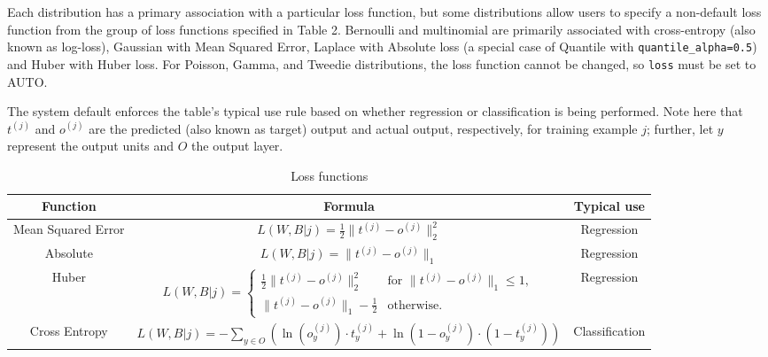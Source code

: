 Each distribution has a primary association with a particular loss function, but some distributions allow users to specify a non-default loss function from the group of loss functions specified in Table 2.  Bernoulli and multinomial are primarily associated with cross-entropy (also known as log-loss), Gaussian with Mean Squared Error, Laplace with Absolute loss (a special case of Quantile with \texttt{quantile\_alpha=0.5}) and Huber with Huber loss.  For Poisson, Gamma, and Tweedie distributions, the loss function cannot be changed, so \texttt{loss} must be set to AUTO.    


The system default enforces the table's typical use rule based on whether regression or classification is being performed. Note here that $t^{(j)}$ and $o^{(j)}$ are the predicted (also known as target) output and actual output, respectively, for training example $j$; further, let $y$ represent the output units and $O$ the output layer.

\begin{table}[ht] 
\caption{Loss functions }
\centering %
\begin{adjustbox}{width=\textwidth} %
\begin{tabular}{c c c} %
\hline\hline %
Function & Formula & Typical use \\ [0.5ex] %
\hline %
Mean Squared Error & $L(W,B | j) = \frac{1}{2}\|t^{(j)} - o^{(j)}\|_2^2$ & Regression \\ %
Absolute & $L(W,B | j) =  \|t^{(j)} - o^{(j)}\|_1$ & Regression \\
Huber & $L(W,B | j) = \begin{cases} \frac{1}{2}\|t^{(j)} - o^{(j)}\|_2^2 & \textrm{for } \|t^{(j)} - o^{(j)}\|_1 \le 1, \\  \|t^{(j)} - o^{(j)}\|_1- \frac{1}{2} & \textrm{otherwise.}\end{cases}$ & Regression \\
Cross Entropy & $L(W,B | j) = -\sum\limits_{y \in O} \left(\ln(o_y^{(j)}) \cdot t_y^{(j)} + \ln(1-o_y^{(j)}) \cdot (1-t_y^{(j)})\right) $ & Classification \\
\hline %
\end{tabular} 
\end{adjustbox}
\label{table:LossFunctions} %
\end{table}

